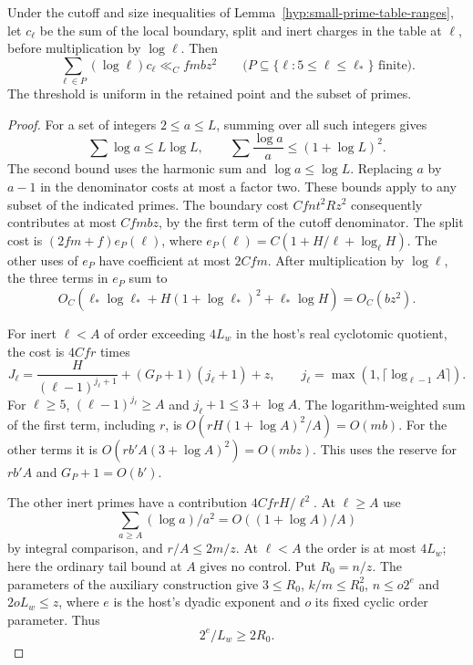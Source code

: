 \begin{proposition}\label{prop:small-prime-cost-total}
Under the cutoff and size inequalities of Lemma~\ref{hyp:small-prime-table-ranges},
let \(c_\ell\) be the sum of the local boundary, split and inert charges in the table at \(\ell\), before multiplication by \(\log\ell\). Then
\[
 \sum_{\ell\in P}(\log\ell)c_\ell\ll_C fmbz^2\qquad\bigl(P\subseteq\{\ell:5\le\ell\le\ell_*\}\text{ finite}\bigr).
\] The threshold
is uniform in the retained point and the subset of primes.
\end{proposition}

\begin{proof}
For a set of integers \(2\le a\le L\), summing over all such
integers gives
\[
 \sum \log a\le L\log L,\qquad
 \sum \frac{\log a}{a}\le (1+\log L)^2.
\]
The second bound uses the harmonic sum and \(\log a\le\log L\).
Replacing \(a\) by \(a-1\) in the denominator costs at most a
factor two. These bounds apply to any subset of the indicated primes.
The boundary cost \(Cfn t^2 R z^2\) consequently contributes at
most \(C fmbz\), by the first term of the cutoff denominator.
The split cost is \((2fm+f)e_P(\ell)\), where
\(e_P(\ell)=C(1+H/\ell+\log_\ell H)\). The other uses of \(e_P\)
have coefficient at most \(2Cfm\). After multiplication by
\(\log\ell\), the three terms in \(e_P\) sum to
\[
 O_C\!\left(\ell_*\log\ell_*+
             H(1+\log\ell_*)^2+\ell_*\log H\right)
       =O_C(bz^2).
\]

For inert \(\ell<A\) of order exceeding \(4L_w\) in the
host's real cyclotomic quotient, the cost is \(4Cfr\) times
\[
 J_\ell=\frac{H}{(\ell-1)^{j_\ell+1}}
         +(G_P+1)(j_\ell+1)+z,\qquad
 j_\ell=\max(1,\lceil\log_{\ell-1}A\rceil).
\]
For \(\ell\ge5\), \((\ell-1)^{j_\ell}\ge A\) and
\(j_\ell+1\le3+\log A\). The logarithm-weighted sum of the
first term, including \(r\), is
\(O(rH(1+\log A)^2/A)=O(mb)\).
For the other terms it is
\(O(rb'A(3+\log A)^2)=O(mbz)\). This uses the reserve for
\(rb'A\) and \(G_P+1=O(b')\).

The other inert primes have a contribution \(4CfrH/\ell^2\).
At \(\ell\ge A\) use
\[
 \sum_{a\ge A}(\log a)/a^2=O((1+\log A)/A)
\]
by integral comparison, and \(r/A\le2m/z\). At \(\ell<A\)
the order is at most \(4L_w\); here the ordinary tail bound at
\(A\) gives no control. Put \(R_0=n/z\). The parameters of the auxiliary construction
give \(3\le R_0\), \(k/m\le R_0^2\), \(n\le o2^e\) and
\(2oL_w\le z\), where \(e\) is the host's dyadic exponent
and \(o\) its fixed cyclic order parameter. Thus
\[
 2^e/L_w\ge2R_0.
\]


\end{proof}
